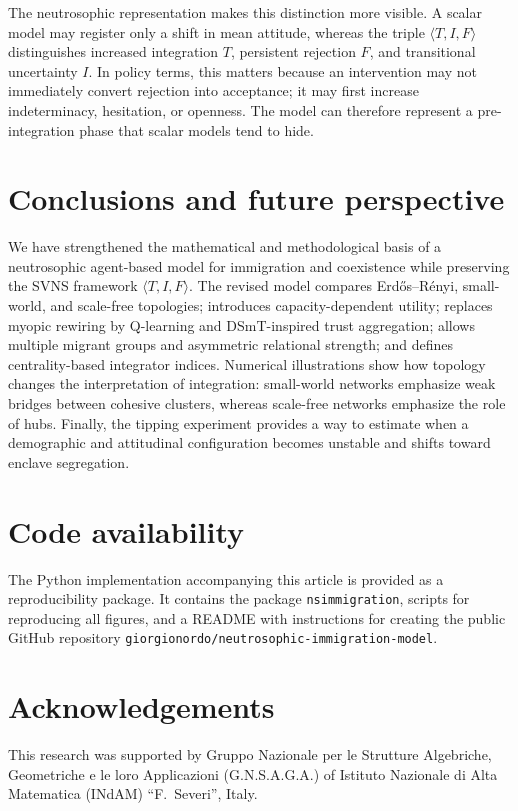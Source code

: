 \documentclass[11pt,a4paper]{article}
\newcommand{\nstriple}[1]{\langle #1 \rangle}
\begin{document}
	The neutrosophic representation makes this distinction more visible. A scalar model may register only a shift in mean attitude, whereas the triple $\nstriple{T,I,F}$ distinguishes increased integration $T$, persistent rejection $F$, and transitional uncertainty $I$. In policy terms, this matters because an intervention may not immediately convert rejection into acceptance; it may first increase indeterminacy, hesitation, or openness. The model can therefore represent a pre-integration phase that scalar models tend to hide.
	
	\section{Conclusions and future perspective}
	We have strengthened the mathematical and methodological basis of a neutrosophic agent-based model for immigration and coexistence while preserving the SVNS framework $\nstriple{T,I,F}$. The revised model compares Erd\H{o}s--R\'enyi, small-world, and scale-free topologies; introduces capacity-dependent utility; replaces myopic rewiring by Q-learning and DSmT-inspired trust aggregation; allows multiple migrant groups and asymmetric relational strength; and defines centrality-based integrator indices. Numerical illustrations show how topology changes the interpretation of integration: small-world networks emphasize weak bridges between cohesive clusters, whereas scale-free networks emphasize the role of hubs. Finally, the tipping experiment provides a way to estimate when a demographic and attitudinal configuration becomes unstable and shifts toward enclave segregation.

\section*{Code availability}
The Python implementation accompanying this article is provided as a reproducibility package. It contains the package \texttt{nsimmigration}, scripts for reproducing all figures, and a README with instructions for creating the public GitHub repository \texttt{giorgionordo/neutrosophic-immigration-model}.

\section*{Acknowledgements}
	This research was supported by Gruppo Nazionale per le Strutture Algebriche, Geometriche e le loro Applicazioni (G.N.S.A.G.A.) of Istituto Nazionale di Alta Matematica (INdAM) ``F.~Severi'', Italy.
	
\end{document}
